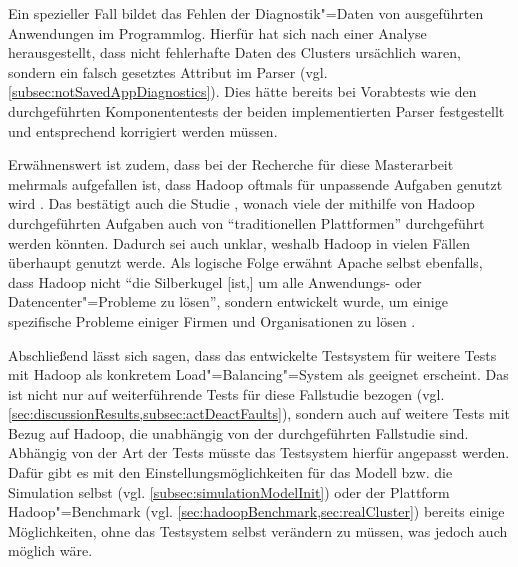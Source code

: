 Ein spezieller Fall bildet das Fehlen der Diagnostik"=Daten von ausgeführten Anwendungen im Programmlog.
Hierfür hat sich nach einer Analyse herausgestellt, dass nicht fehlerhafte Daten des Clusters ursächlich waren, sondern ein falsch gesetztes Attribut im Parser (vgl. \cref{subsec:notSavedAppDiagnostics}).
Dies hätte bereits bei Vorabtests wie den durchgeführten Komponententests der beiden implementierten Parser festgestellt und entsprechend korrigiert werden müssen.

Erwähnenswert ist zudem, dass bei der Recherche für diese Masterarbeit mehrmals aufgefallen ist, dass Hadoop oftmals für unpassende Aufgaben genutzt wird \cite{Ren2013,Vavilapalli2013}.
Das bestätigt auch die Studie \cite{HadoopDataTypes}, wonach viele der mithilfe von Hadoop durchgeführten Aufgaben auch von \enquote{traditionellen Plattformen} durchgeführt werden könnten.
Dadurch sei auch unklar, weshalb Hadoop in vielen Fällen überhaupt genutzt werde.
Als logische Folge erwähnt Apache selbst ebenfalls, dass Hadoop nicht \enquote{die Silberkugel [ist,] um alle Anwendungs- oder Datencenter"=Probleme zu lösen}, sondern entwickelt wurde, um einige spezifische Probleme einiger Firmen und Organisationen zu lösen \cite{HadoopIsNot}.

Abschließend lässt sich sagen, dass das entwickelte Testsystem für weitere Tests mit Hadoop als konkretem Load"=Balancing"=System als geeignet erscheint.
Das ist nicht nur auf weiterführende Tests für diese Fallstudie bezogen (vgl. \cref{sec:discussionResults,subsec:actDeactFaults}), sondern auch auf weitere Tests mit Bezug auf Hadoop, die unabhängig von der durchgeführten Fallstudie sind.
Abhängig von der Art der Tests müsste das Testsystem  hierfür angepasst werden.
Dafür gibt es mit den Einstellungsmöglichkeiten für das Modell bzw. die Simulation selbst (vgl. \cref{subsec:simulationModelInit}) oder der Plattform Hadoop"=Benchmark (vgl. \cref{sec:hadoopBenchmark,sec:realCluster}) bereits einige Möglichkeiten, ohne das Testsystem selbst verändern zu müssen, was jedoch auch möglich wäre.
